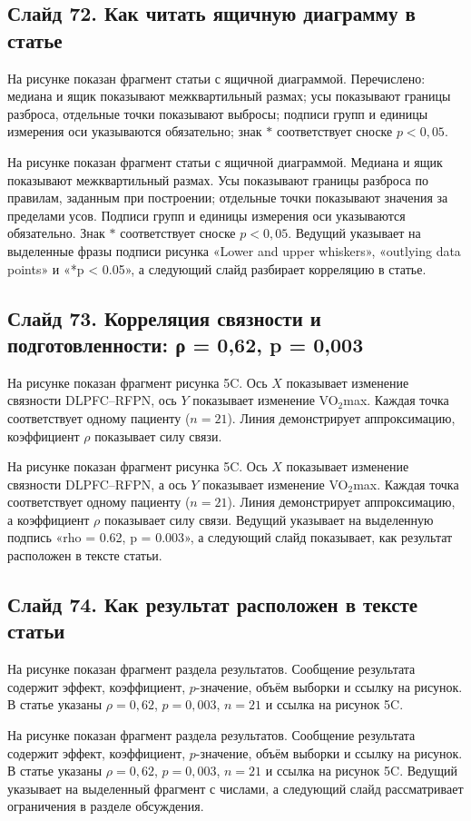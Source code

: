 \documentclass[11pt,a4paper]{article}
\begin{document}
\subsection*{Слайд 72. Как читать ящичную диаграмму в статье}
\begin{onslide}
На рисунке показан фрагмент статьи с ящичной диаграммой. Перечислено: медиана и ящик показывают межквартильный размах; усы показывают границы разброса, отдельные точки показывают выбросы; подписи групп и единицы измерения оси указываются обязательно; знак $*$ соответствует сноске $p < 0{,}05$.
\end{onslide}
На рисунке показан фрагмент статьи с ящичной диаграммой. Медиана и ящик показывают межквартильный размах. Усы показывают границы разброса по правилам, заданным при построении; отдельные точки показывают значения за пределами усов. Подписи групп и единицы измерения оси указываются обязательно. Знак $*$ соответствует сноске $p < 0{,}05$. Ведущий указывает на выделенные фразы подписи рисунка «Lower and upper whiskers», «outlying data points» и «*p < 0.05», а следующий слайд разбирает корреляцию в статье.

\subsection*{Слайд 73. Корреляция связности и подготовленности: ρ = 0,62, p = 0,003}
\begin{onslide}
На рисунке показан фрагмент рисунка 5C. Ось $X$ показывает изменение связности DLPFC--RFPN, ось $Y$ показывает изменение VO$_{2}$max. Каждая точка соответствует одному пациенту ($n = 21$). Линия демонстрирует аппроксимацию, коэффициент $\rho$ показывает силу связи.
\end{onslide}
На рисунке показан фрагмент рисунка 5C. Ось $X$ показывает изменение связности DLPFC--RFPN, а ось $Y$ показывает изменение VO$_{2}$max. Каждая точка соответствует одному пациенту ($n = 21$). Линия демонстрирует аппроксимацию, а коэффициент $\rho$ показывает силу связи. Ведущий указывает на выделенную подпись «rho = 0.62, p = 0.003», а следующий слайд показывает, как результат расположен в тексте статьи.

\subsection*{Слайд 74. Как результат расположен в тексте статьи}
\begin{onslide}
На рисунке показан фрагмент раздела результатов. Сообщение результата содержит эффект, коэффициент, $p$-значение, объём выборки и ссылку на рисунок. В статье указаны $\rho = 0{,}62$, $p = 0{,}003$, $n = 21$ и ссылка на рисунок 5C.
\end{onslide}
На рисунке показан фрагмент раздела результатов. Сообщение результата содержит эффект, коэффициент, $p$-значение, объём выборки и ссылку на рисунок. В статье указаны $\rho = 0{,}62$, $p = 0{,}003$, $n = 21$ и ссылка на рисунок 5C. Ведущий указывает на выделенный фрагмент с числами, а следующий слайд рассматривает ограничения в разделе обсуждения.
\end{document}

